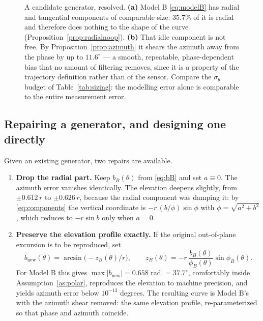 \documentclass[11pt,a4paper]{article}
\begin{document}
\begin{figure}[htbp]
\begin{tikzpicture}
\end{tikzpicture}
\caption{A candidate generator, resolved. \textbf{(a)} Model B
\eqref{eq:modelB} has radial and tangential components of comparable size:
$35.7\%$ of it is radial and therefore does nothing to the shape of the curve
(Proposition~\ref{prop:radialnoop}). \textbf{(b)} That idle component is not
free. By Proposition~\ref{prop:azimuth} it shears the azimuth away from the
phase by up to $11.6^\circ$ --- a smooth, repeatable, phase-dependent bias that
no amount of filtering removes, since it is a property of the trajectory
definition rather than of the sensor. Compare the $\sigma_\theta$ budget of
Table~\ref{tab:sizing}: the modelling error alone is comparable to the entire
measurement error.}
\label{fig:modelB}
\end{figure}

\subsection{Repairing a generator, and designing one directly}
\label{sec:repair}

Given an existing generator, two repairs are available.

\begin{enumerate}
\item \textbf{Drop the radial part.} Keep $b_B(\theta)$ from \eqref{eq:bB} and
set $a\equiv0$. The azimuth error vanishes identically. The elevation deepens
slightly, from $\pm0.612\,r$ to $\pm0.626\,r$, because the radial component was
damping it: by \eqref{eq:components} the vertical coordinate is
$-r\,(b/\phi)\sin\phi$ with $\phi = \sqrt{a^2+b^2}$, which reduces to
$-r\sin b$ only when $a=0$.

\item \textbf{Preserve the elevation profile exactly.} If the original
out-of-plane excursion is to be reproduced, set
\begin{equation}
b_{\text{new}}(\theta) = \arcsin\!\big(-z_B(\theta)/r\big),
\qquad
z_B(\theta) = -r\,\frac{b_B(\theta)}{\phi_B(\theta)}\sin\phi_B(\theta) .
\label{eq:repair}
\end{equation}
For Model B this gives $\max|b_{\text{new}}| = 0.658$ rad $=37.7^\circ$,
comfortably inside Assumption~\ref{as:polar}, reproduces the elevation to
machine precision, and yields azimuth error below $10^{-13}$ degrees. The
resulting curve is Model B's with the azimuth shear removed: the same elevation
profile, re-parameterized so that phase and azimuth coincide.
\end{enumerate}
\end{document}
